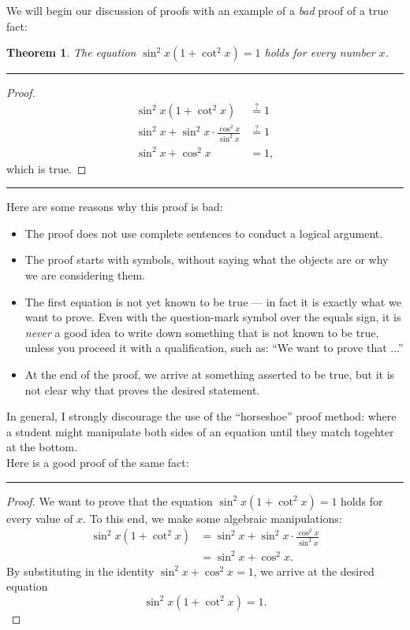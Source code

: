 \documentclass[12pt]{article}
\newtheorem{theorem}{\color{navy}Theorem}[section]
\theoremstyle{definition}
\numberwithin{equation}{subsection}
\begin{document}
We will begin our discussion of proofs with an example of a \emph{bad} proof of a true fact:  



\begin{theorem}
The equation $\sin^2 x (1 + \cot^2 x) = 1$ holds for every number $x$.
\end{theorem}

\hrule

\begin{proof}
\begin{align*}
\sin^2 x(1 + \cot^2 x) &\overset{?}{=} 1 \\
\sin^2 x + \sin^2 x \cdot \frac{\cos^2 x}{\sin^2 x}  &\overset{?}{=} 1 \\
\sin^2 x + \cos^2 x &= 1, 
\end{align*}
which is true.
\end{proof}

\hrule


\vspace{0.4cm}

Here are some reasons why this proof is bad:
\begin{itemize}
\item The proof does not use complete sentences to conduct a logical argument.
\item The proof starts with symbols, without saying what the objects are or why we are considering them.
\item The first equation is not yet known to be true --- in fact it is exactly what we want to prove.  Even with the question-mark symbol over the equals sign, it is \emph{never} a good idea to write down something that is not known to be true, unless you proceed it with a qualification, such as: ``We want to prove that ...''  
\item At the end of the proof, we arrive at something asserted to be true, but it is not clear why that proves the desired statement.
\end{itemize}

In general, I strongly discourage the use of the ``horseshoe'' proof method: where a student might manipulate both sides of an equation until they match togehter at the bottom.\\

Here is a good proof of the same fact:\\

\hrule

\begin{proof}
We want to prove that the equation $\sin^2 x(1 + \cot^2 x) = 1$ holds for every value of $x$.  To this end, we make some algebraic manipulations:
\begin{align*}
\sin^2 x(1 + \cot^2 x) &= \sin^2 x + \sin^2 x \cdot \frac{\cos^2 x}{\sin^2 x} \\
&= \sin^2 x + \cos^2 x.
\end{align*}
By substituting in the identity $\sin^2 x + \cos^2 x = 1$, we arrive at the desired equation 
\[
\sin^2 x(1 + \cot^2 x) = 1.
\]

\end{proof}
\end{document}
